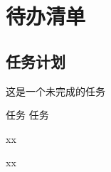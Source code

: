 \chapter*{待办清单}


\section*{任务计划}
\begin{itemize}
    \task 这是一个未完成的任务
    \begin{itemize}
        \task 任务
        \task 任务
        \begin{itemize}
            \task xx
        \end{itemize}
        \task xx
    \end{itemize}
    
\end{itemize}

\listoftodos

